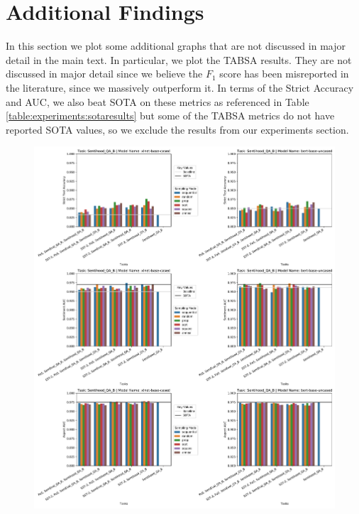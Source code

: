 \documentclass[11pt]{report}
\theoremstyle{Definition}
\theoremstyle{remark}
\begin{document}
\chapter{Additional Findings} \label{appendix:additionalfindings}
In this section we plot some additional graphs that are not discussed in major detail in the main text. In particular, we plot the TABSA results. They are not discussed in major detail since we believe the $F_1$ score has been misreported in the literature, since we massively outperform it. In terms of the Strict Accuracy and AUC, we also beat SOTA on these metrics as referenced in Table \ref{table:experiments:sotaresults} but some of the TABSA metrics do not have reported SOTA values, so we exclude the results from our experiments section.
\begin{figure}
	\includegraphics[width=\textwidth]{SentihoodResults.pdf}
	\label{fig:experiments:sentihoodresults}
\end{figure}
\end{document}
